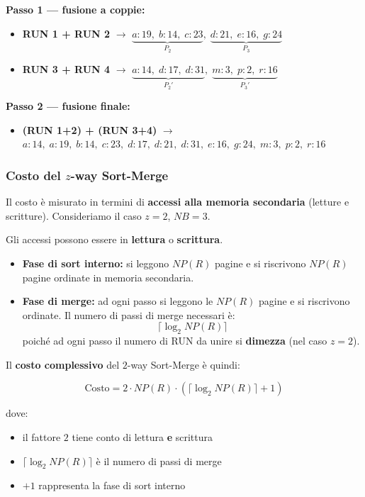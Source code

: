 \bigskip
\noindent\textbf{Passo 1 — fusione a coppie:}
\begin{itemize}
	\item \textbf{RUN 1 + RUN 2} $\longrightarrow$
	$\underbrace{a:19,\; b:14,\; c:23}_{P_2},\;
	\underbrace{d:21,\; e:16,\; g:24}_{P_3}$
	
	\item \textbf{RUN 3 + RUN 4} $\longrightarrow$
	$\underbrace{a:14,\; d:17,\; d:31}_{P_2'},\;
	\underbrace{m:3,\; p:2,\; r:16}_{P_3'}$
\end{itemize}

\bigskip
\noindent\textbf{Passo 2 — fusione finale:}
\begin{itemize}
	\item \textbf{(RUN 1+2) + (RUN 3+4)} $\longrightarrow$
	$a:14,\; a:19,\; b:14,\; c:23,\; d:17,\; d:21,\; d:31,\; e:16,\; g:24,\; m:3,\; p:2,\; r:16$
\end{itemize}

\subsubsection{Costo del $z$-way Sort-Merge}

Il costo è misurato in termini di \textbf{accessi alla memoria secondaria} (letture e scritture). Consideriamo il caso $z = 2$, $NB = 3$.

\bigskip
\noindent Gli accessi possono essere in \textbf{lettura} o \textbf{scrittura}.

\begin{itemize}
	\item \textbf{Fase di sort interno:} si leggono $NP(R)$ pagine e si riscrivono $NP(R)$ pagine ordinate in memoria secondaria.
	
	\item \textbf{Fase di merge:} ad ogni passo si leggono le $NP(R)$ pagine e si riscrivono ordinate. Il numero di passi di merge necessari è:
	\[
	\lceil \log_2 NP(R) \rceil
	\]
	poiché ad ogni passo il numero di RUN da unire si \textbf{dimezza} (nel caso $z = 2$).
\end{itemize}

\bigskip
\noindent Il \textbf{costo complessivo} del $2$-way Sort-Merge è quindi:

\[
\text{Costo} = 2 \cdot NP(R) \cdot (\lceil \log_2 NP(R) \rceil + 1)
\]

dove:
\begin{itemize}
	\item il fattore $2$ tiene conto di lettura \textbf{e} scrittura
	\item $\lceil \log_2 NP(R) \rceil$ è il numero di passi di merge
	\item $+1$ rappresenta la fase di sort interno
\end{itemize}

